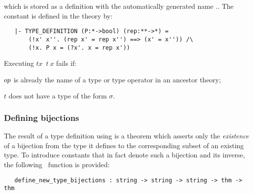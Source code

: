 \noindent which is stored as a definition with the automatically
generated name
.. The constant
is defined in the theory  by:

\begin{hol}\begin{verbatim}
   |- TYPE_DEFINITION (P:*->bool) (rep:**->*) =
       (!x' x''. (rep x' = rep x'') ==> (x' = x'')) /\
       (!x. P x = (?x'. x = rep x'))
\end{verbatim}\end{hol}

\noindent Executing $t$$x$\ $t\ x$\ml{)} fails if:
\begin{myenumerate}
\item ${\sl op}$ is already the name of a type or type operator
in an ancestor theory;
\item $t$ does not have a type of the form $\sigma$\ml{->bool}.
\end{myenumerate}

\subsubsection{Defining bijections}

The result of a type definition using \ml{new\_type\_definition} is a theorem
which asserts only the {\it existence\/} of a
bijection
from the type it defines to the corresponding subset of an existing type.  To
introduce constants that in fact denote such a bijection and its inverse, the
following \ML\ function is provided:

\begin{boxed}
\begin{verbatim}
   define_new_type_bijections : string -> string -> string -> thm -> thm
\end{verbatim}\end{boxed}

